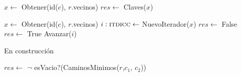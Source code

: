 \begin{Algoritmos}
\begin{algorithm}
\begin{algorithmic}[1]
  \State $x \gets$ Obtener(id($c$), $r$.vecinos)
  \State $res \gets$ Claves($x$)
 \EndProcedure
\end{algorithmic}


\begin{algorithmic}[1]
  \State $x \gets$ Obtener(id($c$), $r$.vecinos)
  \State $i :\textsc{itdicc} \gets$ NuevoIterador($x$)
  \State $res \gets$ False
     $res \gets$ True  \EndIf
    \State Avanzar($i$)
  \EndWhile
 \EndProcedure
\end{algorithmic}



\begin{algorithmic}[1]
   \State En construcción 
\EndProcedure
\end{algorithmic}


\begin{algorithmic}[1]
   \State $res \gets$ $\neg$ esVacio?(CaminosMinimos($r$,$c_1$, $c_2$))
\EndProcedure
\end{algorithmic}


\end{algorithm}






\end{Algoritmos}
